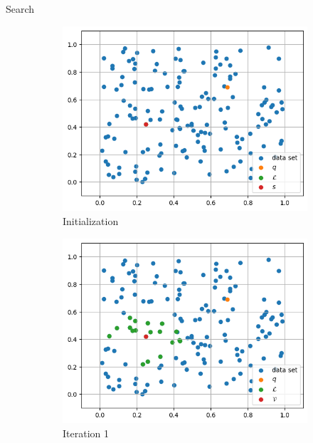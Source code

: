 \begin{frame}{Search}
    \begin{figure}[h]
        \centering
        \hfill
        \begin{subfigure}{0.31\textwidth}
            \includegraphics[width=\textwidth]{images/greedy-search-begin}
            \caption{Initialization}
        \end{subfigure}
        \hfill
        \begin{subfigure}{0.31\textwidth}
            \includegraphics[width=\textwidth]{images/greedy-search-1}
            \caption{Iteration 1}
        \end{subfigure}
        \hfill
        \begin{subfigure}{0.31\textwidth}

\end{subfigure}
\end{figure}
\end{frame}
